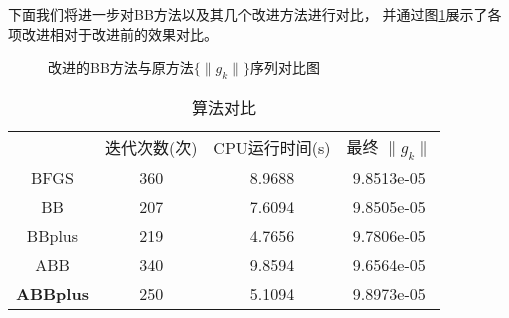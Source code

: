 下面我们将进一步对BB方法以及其几个改进方法进行对比，
并通过图\ref{BBcontrast}展示了各项改进相对于改进前的效果对比。

\begin{figure}[htbp]
	\centering
	\quad
	\quad
	\quad
	\caption{改进的BB方法与原方法$ \{ \|  g_{k} \| \} $序列对比图}
	\label{BBcontrast}	
\end{figure}

\begin{table}[thp]
	\centering
	\begin{tabular}{cccc}
		\toprule
		\hline
		& 迭代次数(次) & CPU运行时间(s) & 最终 $ \|  g_{k} \|  $ \\
		\cmidrule(lr){2-4}
		BFGS & 360 & 8.9688 & 9.8513e-05 \\
		
		BB & 207 &  7.6094 & 9.8505e-05 \\
		
		BBplus & 219 &  4.7656 & 9.7806e-05 \\
		
		ABB & 340 &  9.8594 &  9.6564e-05\\
		
		\textbf{ABBplus} & 250 & 5.1094 &  9.8973e-05\\
		\hline
	\end{tabular}
	\caption{算法对比}
	\label{al}
\end{table}

